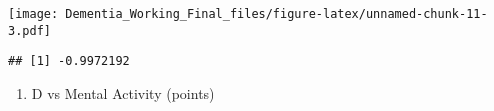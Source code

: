 \documentclass[]{article}
\newenvironment{Shaded}{\begin{snugshade}}{\end{snugshade}}
\newcommand{\KeywordTok}[1]{\textcolor[rgb]{0.13,0.29,0.53}{\textbf{#1}}}
\newcommand{\NormalTok}[1]{#1}
\newcommand{\OperatorTok}[1]{\textcolor[rgb]{0.81,0.36,0.00}{\textbf{#1}}}
\providecommand{\tightlist}{%
  \setlength{\itemsep}{0pt}\setlength{\parskip}{0pt}}
\begin{document}
\texttt{[image: Dementia\_Working\_Final\_files/figure-latex/unnamed-chunk-11-3.pdf]}

\begin{Shaded}
\end{Shaded}

\begin{verbatim}
## [1] -0.9972192
\end{verbatim}

\begin{enumerate}
\def\labelenumi{\alph{enumi}.}
\setcounter{enumi}{2}
\tightlist
\item
  D vs Mental Activity (points)
\end{enumerate}
\end{document}
